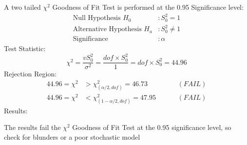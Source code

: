A two tailed $\chi^2$ Goodness of Fit Test is performed at the 0.95 Significance level:
\begin{align*}
\text{Null Hypothesis } H_0 &: S_0^2 = 1 \\
\text{Alternative Hypothesis } H_a &: S_0^2 \neq 1 \\
\text{Significance } &: \alpha
\end{align*}
Test Statistic:
\[
\chi^2 = \dfrac{vS_0^2}{\sigma^2} = \dfrac{dof\times S_0^2}{1} = dof\times S_0^2 = 44.96
\]
Rejection Region:
\begin{align*}
44.96 = \chi^2 &> \chi_{(\alpha/2,dof)}^2 = 46.73 \hspace{1cm} &(FAIL)\\
44.96 = \chi^2 &< \chi_{(1-\alpha/2,dof)}^2 = 47.95 \hspace{1cm} &(FAIL)
\end{align*}
Results:

The results fail the $\chi^2$ Goodness of Fit Test at the 0.95 significance level, so check for blunders or a poor stochastic model
